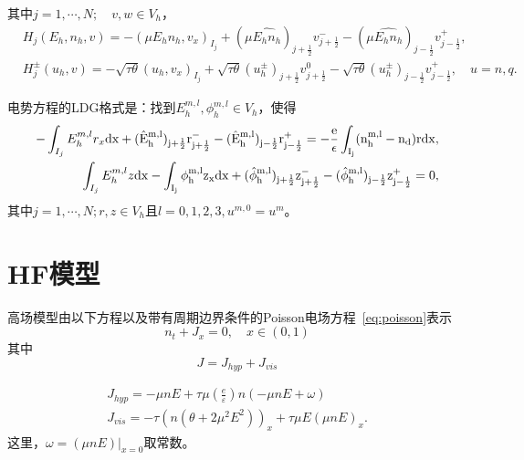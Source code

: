 其中$j = 1,\cdots,N;\quad v,w \in V_h$，
\begin{align}
     & H_j(E_h,n_h,v)    = - (\mu E_h n_h, v_x)_{I_j} + (\mu \hat{E_h n_h})_{j+\frac{1}{2}}v_{j+\frac{1}{2}}^- - (\mu \hat{E_h n_h})_{j-\frac{1}{2}}v_{j-\frac{1}{2}}^+, \label{eq:IMEX:DD:notation:1}                                        \\
     & H_j^{\pm}(u_h,v)  =- \sqrt{\tau \theta}(u_h,v_x)_{I_j} + \sqrt{\tau\theta}(u_h^{\pm})_{j+\frac{1}{2}}v_{j+\frac{1}{2}}^0 - \sqrt{\tau\theta}(u_h^{\pm})_{j-\frac{1}{2}}v_{j-\frac{1}{2}}^+,\quad u = n,q.\label{eq:IMEX:DD:notation:2}
\end{align}

电势方程的LDG格式是：找到$E_h^{m,l},\phi_h^{m,l} \in V_h$，使得
\begin{align}
    -\int_{I_j} E_h^{m,l}r_x \rm{d}x + (\hat{E}_h^{m,l})_{j+\frac{1}{2}}r_{j+\frac{1}{2}}^- - (\hat{E}_h^{m,l})_{j-\frac{1}{2}}r_{j-\frac{1}{2}}^+ = -\frac{e}{\epsilon}\int_{I_j}(n_h^{m,l} - n_d) r\rm{d} x, \label{eq:IMEX:poisson:LDG:1} \\
    \int_{I_j} E_h^{m,l}z \rm{d}x - \int_{I_j} \phi_h^{m,l}z_x \rm{d}x  + (\hat{\phi}_h^{m,l})_{j+\frac{1}{2}}z^-_{j+\frac{1}{2}} - (\hat{\phi}_h^{m,l})_{j-\frac{1}{2}}z_{j-\frac{1}{2}}^+  = 0,\label{eq:IMEX:poisson:LDG:2}
\end{align}
其中$j = 1,\cdots,N; r,z \in V_h$且$l = 0,1,2,3, u^{m,0} = u^m$。

\section{HF模型}
高场模型由以下方程以及带有周期边界条件的Poisson电场方程~\eqref{eq:poisson}表示
\begin{equation}
    n_{t}+J_{x}=0, \quad x \in(0,1) \label{eq:HF}
\end{equation}
其中
$$
    J=J_{h y p}+J_{v i s}
$$

$$
    \begin{gathered}
        J_{h y p}=-\mu n E+\tau \mu\left(\frac{e}{\varepsilon}\right) n(-\mu n E+\omega) \\
        J_{v i s}=-\tau\left(n\left(\theta+2 \mu^{2} E^{2}\right)\right)_{x}+\tau \mu E(\mu n E)_{x} .
    \end{gathered}
$$
这里，$\omega=\left.(\mu n E)\right|_{x=0}$取常数。
